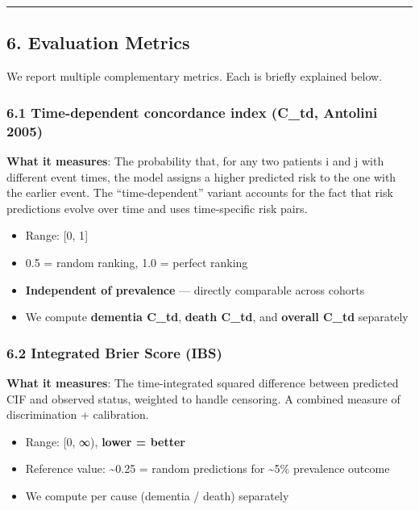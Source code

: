 \documentclass[
  11pt,
]{article}
\providecommand{\tightlist}{%
  \setlength{\itemsep}{0pt}\setlength{\parskip}{0pt}}
\begin{document}
\begin{center}\rule{0.5\linewidth}{0.5pt}\end{center}

\subsection{6. Evaluation Metrics}\label{evaluation-metrics}

We report multiple complementary metrics. Each is briefly explained
below.

\subsubsection{6.1 Time-dependent concordance index (C\_td, Antolini
2005)}\label{time-dependent-concordance-index-c_td-antolini-2005}

\textbf{What it measures}: The probability that, for any two patients i
and j with different event times, the model assigns a higher predicted
risk to the one with the earlier event. The ``time-dependent'' variant
accounts for the fact that risk predictions evolve over time and uses
time-specific risk pairs.

\begin{itemize}
\tightlist
\item
  Range: {[}0, 1{]}
\item
  0.5 = random ranking, 1.0 = perfect ranking
\item
  \textbf{Independent of prevalence} --- directly comparable across
  cohorts
\item
  We compute \textbf{dementia C\_td}, \textbf{death C\_td}, and
  \textbf{overall C\_td} separately
\end{itemize}

\subsubsection{6.2 Integrated Brier Score
(IBS)}\label{integrated-brier-score-ibs}

\textbf{What it measures}: The time-integrated squared difference
between predicted CIF and observed status, weighted to handle censoring.
A combined measure of discrimination + calibration.

\begin{itemize}
\tightlist
\item
  Range: {[}0, ∞), \textbf{lower = better}
\item
  Reference value: \textasciitilde0.25 = random predictions for
  \textasciitilde5\% prevalence outcome
\item
  We compute per cause (dementia / death) separately
\end{itemize}
\end{document}
